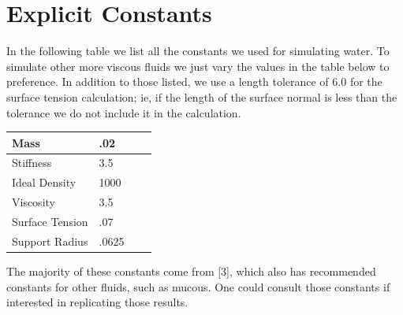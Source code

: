 \documentclass[11pt]{article}
\begin{document}
\section*{Explicit Constants}
In the following table we list all the constants we used for simulating water. To simulate other more viscous fluids we just vary the values in the table below to preference. In addition to those listed, we use a length tolerance of $6.0$ for the surface tension calculation; ie, if the length of the surface normal is less than the tolerance we do not include it in the calculation.

\begin{center}
    \begin{tabular}{| l | l | l | l |}
    \hline
    Mass & .02 \\ \hline
    Stiffness & 3.5\\ \hline
    Ideal Density & 1000 \\ \hline
    Viscosity & 3.5\\ \hline
    Surface Tension & .07 \\ \hline
    Support Radius & .0625 \\ \hline
    \end{tabular}
\end{center}
The majority of these constants come from [3], which also has recommended constants for other fluids, such as mucous. One could consult those constants if interested in replicating those results.
\end{document}
